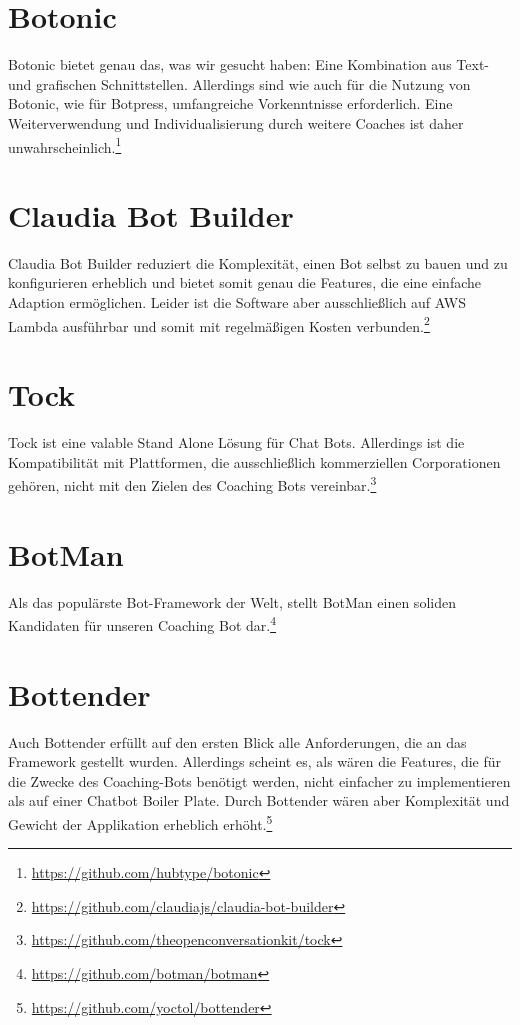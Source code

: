     \section{Botonic} 
        Botonic bietet genau das, was wir gesucht haben: Eine Kombination aus Text- und grafischen Schnittstellen. Allerdings sind wie auch für die Nutzung von Botonic, wie für Botpress, umfangreiche Vorkenntnisse erforderlich. Eine Weiterverwendung und Individualisierung durch weitere Coaches ist daher unwahrscheinlich.\footnote{\url{https://github.com/hubtype/botonic}}
        

    \section{Claudia Bot Builder} 
        Claudia Bot Builder reduziert die Komplexität, einen Bot selbst zu bauen und zu konfigurieren erheblich und bietet somit genau die Features, die eine einfache Adaption ermöglichen. Leider ist die Software aber ausschließlich auf AWS Lambda ausführbar und somit mit regelmäßigen Kosten verbunden.\footnote{\url{https://github.com/claudiajs/claudia-bot-builder}}
        

    \section{Tock} 
        Tock ist eine valable Stand Alone Lösung für Chat Bots. Allerdings ist die Kompatibilität mit Plattformen, die ausschließlich kommerziellen Corporationen gehören, nicht mit den Zielen des Coaching Bots vereinbar.\footnote{\url{https://github.com/theopenconversationkit/tock}}
        

    \section{BotMan} \label{BotMan}
        Als das populärste Bot-Framework der Welt, stellt BotMan einen soliden Kandidaten für unseren Coaching Bot dar.\footnote{\url{https://github.com/botman/botman}}
        

    \section{Bottender} 
        Auch Bottender erfüllt auf den ersten Blick alle Anforderungen, die an das Framework gestellt wurden. Allerdings scheint es, als wären die Features, die für die Zwecke des Coaching-Bots benötigt werden, nicht einfacher zu implementieren als auf einer Chatbot Boiler Plate. Durch Bottender wären aber Komplexität und Gewicht der Applikation erheblich erhöht.\footnote{\url{https://github.com/yoctol/bottender}}
        

